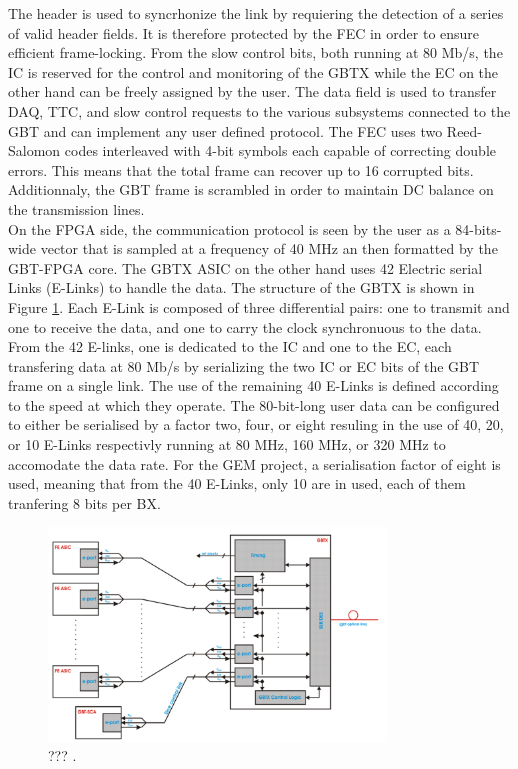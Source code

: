       The header is used to syncrhonize the link by requiering the detection of a series of valid header fields. It is therefore protected by the FEC in order to ensure efficient frame-locking. From the slow control bits, both running at 80 Mb/s, the IC is reserved for the control and monitoring of the GBTX while the EC on the other hand can be freely assigned by the user. The data field is used to transfer DAQ, TTC, and slow control requests to the various subsystems connected to the GBT and can implement any user defined protocol. The FEC uses two Reed-Salomon codes interleaved with 4-bit symbols each capable of correcting double errors. This means that the total frame can recover up to 16 corrupted bits. Additionnaly, the GBT frame is scrambled in order to maintain DC balance on the transmission lines. \\

      On the FPGA side, the communication protocol is seen by the user as a 84-bits-wide vector that is sampled at a frequency of 40 MHz an then formatted by the GBT-FPGA core. The GBTX ASIC on the other hand uses 42 Electric serial Links (E-Links) to handle the data. The structure of the GBTX is shown in Figure \ref{fig:II-2-daq-gbt-asic}. Each E-Link is composed of three differential pairs: one to transmit and one to receive the data, and one to carry the clock synchronuous to the data. From the 42 E-links, one is dedicated to the IC and one to the EC, each transfering data at 80 Mb/s by serializing the two IC or EC bits of the GBT frame on a single link. The use of the remaining 40 E-Links is defined according to the speed at which they operate. The 80-bit-long user data can be configured to either be serialised by a factor two, four, or eight resuling in the use of 40, 20, or 10 E-Links respectivly running at 80 MHz, 160 MHz, or 320 MHz to accomodate the data rate. For the GEM project, a serialisation factor of eight is used, meaning that from the 40 E-Links, only 10 are in used, each of them tranfering 8 bits per BX. \\

      \begin{figure}[h!]
        \centering
        \includegraphics[width=0.8\textwidth]{img/II-2-daq/gbt-asic.png}
        \caption{??? \cite{Moreira:1235836}.}
        \label{fig:II-2-daq-gbt-asic}
      \end{figure}

